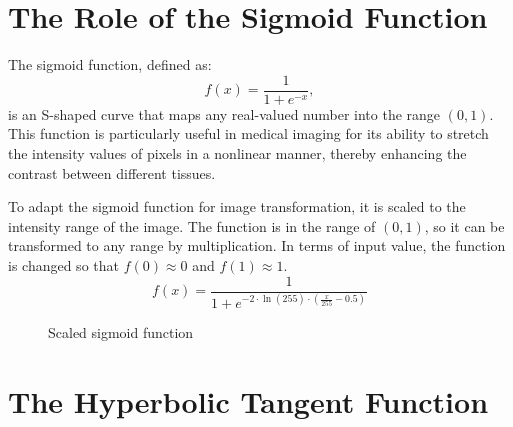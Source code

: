 \documentclass[a4paper]{article}
\begin{document}
\section{The Role of the Sigmoid Function}

The sigmoid function, defined as:
\begin{equation}
f(x) = \frac{1}{1 + e^{-x}},
\end{equation}
is an S-shaped curve that maps any real-valued number into the range $(0,1)$. This function is particularly useful in medical imaging for its ability to stretch the intensity values of pixels in a nonlinear manner, thereby enhancing the contrast between different tissues.

To adapt the sigmoid function for image transformation, it is scaled to the intensity range of the image. The function is in the range of $(0,1)$, so it can be transformed to any range by multiplication. In terms of input value, the function is changed so that $f(0) \approx 0$ and $f(1) \approx 1$.
\begin{equation}
\label{transformedSigmoid}
f(x) = \frac{1}{1 + e^{-2 \cdot \ln(255) \cdot \left(\frac{x}{255} - 0.5\right)}}
\end{equation}

\begin{figure}[h!]
\centering
{}
\caption{Scaled sigmoid function }
\end{figure}

\section{The Hyperbolic Tangent Function}
\end{document}
